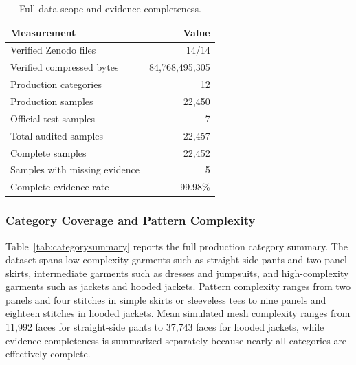 \documentclass[pdflatex,sn-mathphys-num]{sn-jnl}
\begin{document}
\begin{table}[!htbp]
\caption{Full-data scope and evidence completeness.}\label{tab:scope}
\centering
\begin{tabular}{lr}
\toprule
Measurement & Value \\
\midrule
Verified Zenodo files & 14/14 \\
Verified compressed bytes & 84,768,495,305 \\
Production categories & 12 \\
Production samples & 22,450 \\
Official test samples & 7 \\
Total audited samples & 22,457 \\
Complete samples & 22,452 \\
Samples with missing evidence & 5 \\
Complete-evidence rate & 99.98\% \\
\bottomrule
\end{tabular}
\end{table}

\subsubsection{Category Coverage and Pattern Complexity}

Table~\ref{tab:categorysummary} reports the full production category summary. The dataset spans low-complexity garments such as straight-side pants and two-panel skirts, intermediate garments such as dresses and jumpsuits, and high-complexity garments such as jackets and hooded jackets. Pattern complexity ranges from two panels and four stitches in simple skirts or sleeveless tees to nine panels and eighteen stitches in hooded jackets. Mean simulated mesh complexity ranges from 11,992 faces for straight-side pants to 37,743 faces for hooded jackets, while evidence completeness is summarized separately because nearly all categories are effectively complete.
\end{document}
